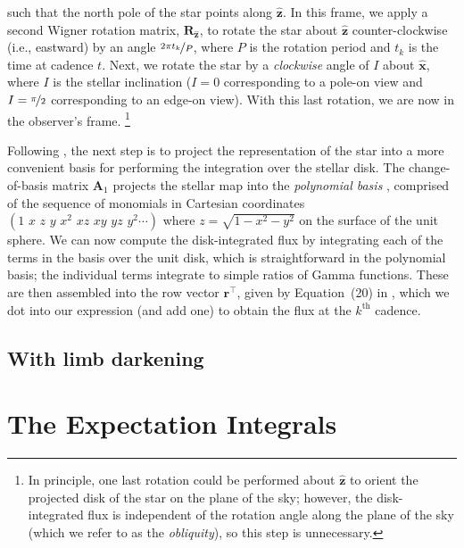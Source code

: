 \documentclass[modern]{aastex62}
\begin{document}
such that the north pole of the star points along $\hat{\mathbf{z}}$. In this
frame, we apply a second Wigner rotation matrix, $\mathbf{R}_{\hat{\mathbf{z}}}$,
to rotate the star about $\hat{\mathbf{z}}$ counter-clockwise (i.e., eastward) by an angle
$\nicefrac{2\pi t_k}{P}$, where $P$ is the rotation period and $t_k$ is the
time at cadence $t$.
Next, we rotate the star by a \emph{clockwise} angle of $I$ about $\hat{\mathbf{x}}$,
where $I$ is the stellar inclination ($I = 0$ corresponding to a pole-on view and
$I = \nicefrac{\pi}{2}$ corresponding to an edge-on view). With this last rotation,
we are now in the observer's frame.%
\footnote{In principle, one last rotation could be performed about $\hat{\mathbf{z}}$
    to orient the projected disk of the star on the plane of the sky; however, the disk-integrated
    flux is independent of the rotation angle along the plane of the sky
    (which we refer to as the \emph{obliquity}), so this step is unnecessary.}

Following \citet{Luger2019}, the next step is to project the representation of
the star into a more convenient basis for performing the integration over the stellar
disk. The change-of-basis matrix $\mathbf{A}_1$ \citep[c.f. Appendix~B in][]{Luger2019}
projects the stellar map into the \emph{polynomial basis}
\citep[Equation~7 in][]{Luger2019}, comprised of the sequence of monomials in Cartesian
coordinates
$\left( 1 \,\, x \,\, z \,\, y \,\, x^2 \,\, xz \,\, xy \,\, yz \,\, y^2 \cdots \right)$
where $z = \sqrt{1 - x^2 - y^2}$ on the surface of the unit sphere. We
can now compute the disk-integrated flux by integrating each of the terms in the basis
over the unit disk, which is straightforward in the polynomial basis; the
individual terms integrate to simple ratios of Gamma functions. These are then
assembled into the row vector $\mathbf{r}^\top$, given by Equation~(20) in
\citet{Luger2019}, which we dot into our expression (and add one) to obtain the
flux at the $k^\mathrm{th}$ cadence.

\subsection{With limb darkening}
%

\section{The Expectation Integrals}
\label{sec:integrals}
\end{document}
